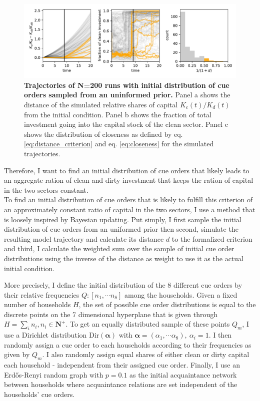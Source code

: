 \begin{figure}[t]
  \centering
  \includegraphics[width= \textwidth]{figures/initial_condition_sampling.pdf}
  \caption[Trajectories of N=200 runs with initial conditions for cue orders sampled from an uninformed prior]{\textbf{Trajectories of N=200 runs with initial distribution of cue orders sampled from an uninformed prior.} Panel a shows the distance of the simulated relative shares of capital $K_c(t)/K_d(t)$ from the initial condition. Panel b shows the fraction of total investment going into the capital stock of the clean sector. Panel c shows the distribution of closeness as defined by eq. \ref{eq:distance_criterion} and eq. \ref{eq:closeness} for the simulated trajectories.}
  \label{fig:initial_conditions_sampled}
\end{figure}
Therefore, I want to find an initial distribution of cue orders that likely leads to an aggregate ration of clean and dirty investment that keeps the ration of capital in the two sectors constant.\\

To find an initial distribution of cue orders that is likely to fulfill this criterion of an approximately constant ratio of capital in the two sectors, I use a method that is loosely inspired by Bayesian updating. Put simply, I first sample the initial distribution of cue orders from an uniformed prior then second, simulate the resulting model trajectory and calculate its distance $d$ to the formalized criterion and third, I calculate the weighted sum over the sample of initial cue order distributions using the inverse of the distance as weight to use it as the actual initial condition.



More precisely, I define the initial distribution of the 8 different cue orders by their relative frequencies $Q: [n_1, \cdots n_8]$ among the households. Given a fixed number of households $H$, the set of possible cue order distributions is equal to the discrete points on the 7 dimensional hyperplane that is given through $H = \sum_i n_i, n_i \in \mathbf{N^{+}}$. To get an equally distributed sample of these points $Q_m$, I use a Dirichlet distribution $\mathrm{Dir}(\mathbf{\alpha})$ with $\mathbf{\alpha}=(\alpha_1, \cdots \alpha_8), ~ \alpha_i=1$. I then randomly assign a cue order to each households according to their frequencies as given by $Q_m$. I also randomly assign equal shares of either clean or dirty capital each household - independent from their assigned cue order. Finally, I use an Erd\H{o}s-Renyi random graph with $p=0.1$ as the initial acquaintance network between households where acquaintance relations are set independent of the households' cue orders.


